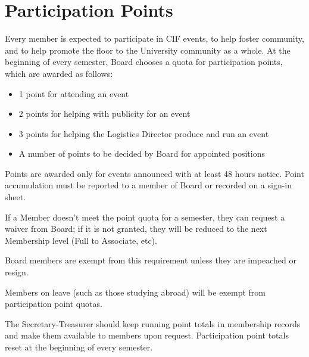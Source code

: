 \section{Participation Points}
\label{sec:participation-points}

Every member is expected to participate in CIF events, to help foster community, and to help promote the floor to the University community as a whole. At the beginning of every semester, Board chooses a quota for participation points, which are awarded as follows:
\begin{itemize}
	\item 1 point for attending an event
	\item 2 points for helping with publicity for an event
	\item 3 points for helping the Logistics Director produce and run an event
	\item A number of points to be decided by Board for appointed positions
\end{itemize}
Points are awarded only for events announced with at least 48 hours notice.  Point accumulation must be reported to a member of Board or recorded on a sign-in sheet.

If a Member doesn't meet the point quota for a semester, they can request a waiver from Board; if it is not granted, they will be reduced to the next Membership level (Full to Associate, etc).

Board members are exempt from this requirement unless they are impeached or resign.

Members on leave (such as those studying abroad) will be exempt from participation point quotas.

The Secretary-Treasurer should keep running point totals in membership records and make them available to members upon request. Participation point totals reset at the beginning of every semester.
